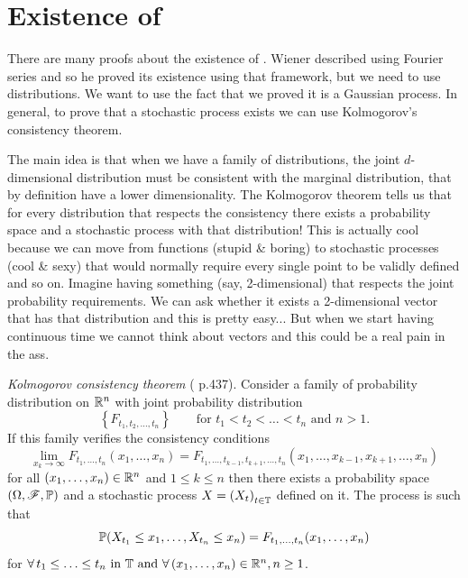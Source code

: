 \documentclass[12pt]{report}
\begin{document}
\section{Existence of \bwm}
There are many proofs about the existence of \bwm{}. Wiener described \bwm{} using Fourier series and so he proved its existence using that framework, but we need to use distributions. We want to use the fact that we proved it is a Gaussian process. In general, to prove that a stochastic process exists we can use Kolmogorov's consistency theorem.\par
The main idea is that when we have a family of distributions, the joint $d$-dimensional distribution must be consistent with the marginal distribution, that by definition have a lower dimensionality. The Kolmogorov theorem tells us that for every distribution that respects the consistency there exists a probability space and a stochastic process with that distribution! This is actually cool because we can move from functions (stupid \& boring) to stochastic processes (cool \& sexy) that would normally require every single point to be validly defined and so on. Imagine having something (say, 2-dimensional) that respects the joint probability requirements. We can ask whether it exists a 2-dimensional vector that has that distribution and this is pretty easy... But when we start having continuous time we cannot think about vectors and this could be a real pain in the ass.
\begin{theorem}
	\emph{Kolmogorov consistency theorem} (\cinlar{} p.437). Consider a family of probability distribution on $\mathbb{R}^{n}$ with joint probability distribution
	\begin{equation*}
		\left\{F_{t_{1},t_{2},\ldots,t_{n}}\right\}\qquad\text{for }t_{1}<t_{2}<\ldots<t_{n}\text{ and }n>1.
	\end{equation*}
	If this family verifies the consistency conditions
	\begin{equation*}
		\lim_{x_{k}\to\infty}F_{t_{1},\ldots,t_{n}}(x_{1},\ldots,x_{n})=F_{t_{1},\ldots,t_{k-1},t_{k+1},\ldots,t_{n}}(x_{1},\ldots,x_{k-1},x_{k+1},\ldots,x_{n})
	\end{equation*}
	for all $(x_{1},\ldots,x_{n})\in\mathbb{R}^{n}$ and $1\leq k\leq n$ then there exists a probability space $(\Omega,\mathscr{F},\mathbb{P})$ and a stochastic process $X={(X_{t})}_{t\in\mathbb{T}}$ defined on it. The process is such that
	\begin{equation*}
		\mathbb{P}(X_{t_{1}}\leq x_{1},\ldots,X_{t_{n}}\leq x_{n})=F_{t_{1},\ldots,t_{n}}(x_{1},\ldots,x_{n})
	\end{equation*}
	for $\forall\, t_{1}\leq\ldots\leq t_{n}\text{ in }\mathbb{T}\text{ and }\forall\,(x_{1},\ldots,x_{n})\in\mathbb{R}^{n},n\geq 1$.
\end{theorem}
\end{document}
